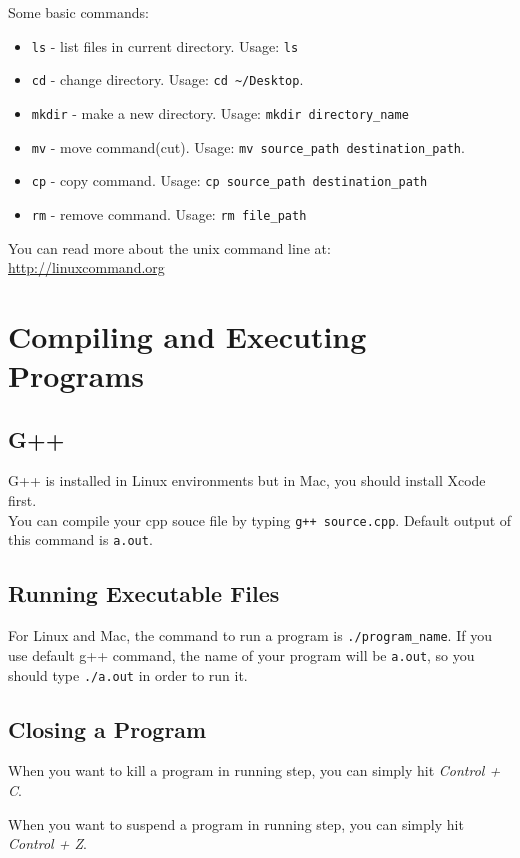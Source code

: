 \documentclass[12pt]{article}
\begin{document}
Some basic commands:
\begin{itemize}
  \item \texttt{ls} - list files in current directory. Usage: \texttt{ls}
  \item \texttt{cd} - change directory. Usage: \texttt{cd \textasciitilde/Desktop}.
  \item \texttt{mkdir} - make a new directory. Usage: \texttt{mkdir directory\_name}
  \item \texttt{mv} - move command(cut). Usage: \texttt{mv source\_path destination\_path}.
  \item \texttt{cp} - copy command. Usage: \texttt{cp source\_path destination\_path}
  \item \texttt{rm} - remove command. Usage: \texttt{rm file\_path}
\end{itemize}

You can read more about the unix command line at:\\
\url{http://linuxcommand.org}

\section{Compiling and Executing Programs}

\subsection{G++}
G++ is installed in Linux environments but in Mac, you should install Xcode first.\\
  You can compile your cpp souce file by typing \texttt{g++ source.cpp}. Default output of this command is \texttt{a.out}.

\subsection{Running Executable Files}
 For Linux and Mac, the command to run a program is \texttt{./program\_name}. If you use default g++ command, the name of your program will be \texttt{a.out}, so you should type \texttt{./a.out} in order to run it.

\subsection{Closing a Program}
When you want to kill a program in running step, you can simply hit \emph{Control + C}.

When you want to suspend a program in running step, you can simply hit \emph{Control + Z}.
\end{document}
